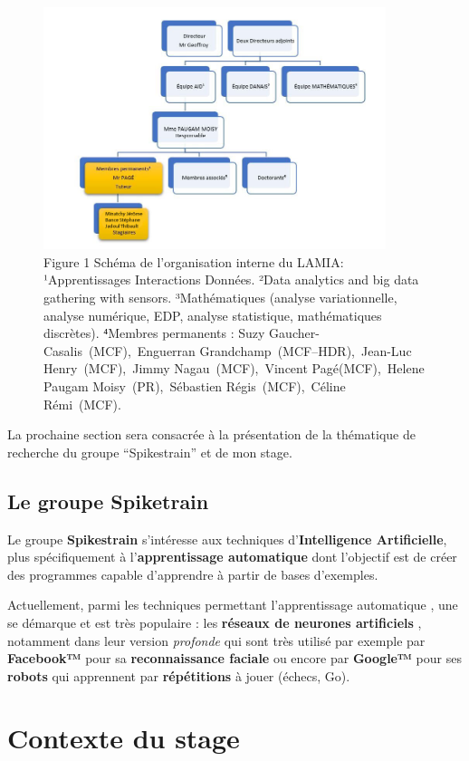 \begin{figure}[h!]
\centering
\includegraphics[width=10cm]{./images/orga.jpg}
\caption{Figure 1 Schéma de l'organisation interne du LAMIA:
¹Apprentissages Interactions Données. ²Data analytics and big data
gathering with sensors. ³Mathématiques (analyse variationnelle, analyse
numérique, EDP, analyse statistique, mathématiques discrètes). ⁴Membres
permanents : Suzy Gaucher-Casalis~(MCF),~Enguerran
Grandchamp~(MCF--HDR),~Jean-Luc Henry~(MCF),~Jimmy Nagau~(MCF),~Vincent
Pagé(MCF),~Helene Paugam Moisy~(PR),~Sébastien Régis~(MCF),~Céline
Rémi~(MCF).}
\end{figure}

La prochaine section sera consacrée à la présentation de la thématique
de recherche du groupe ``Spikestrain'' et de mon stage.


\hypertarget{Objectif_Spike}{%
\subsection{Le groupe Spiketrain}\label{Groupe_Spiketrain}}

Le groupe \textbf{Spikestrain} s'intéresse aux techniques
d'\textbf{Intelligence Artificielle}, plus spécifiquement à
l'\textbf{apprentissage automatique} dont l'objectif est de créer des
programmes capable d'apprendre à partir de bases d'exemples.

Actuellement, parmi les techniques permettant l'apprentissage
automatique , une se démarque et est très populaire : les
\textbf{réseaux de neurones artificiels} , notamment dans leur version
\emph{profonde} qui sont très utilisé par exemple par \textbf{Facebook™}
pour sa \textbf{reconnaissance faciale} ou encore par \textbf{Google™}
pour ses \textbf{robots} qui apprennent par \textbf{répétitions} à jouer
(échecs, Go).


\hypertarget{Contexte}{%
\section{Contexte du stage}\label{Contexte}}

